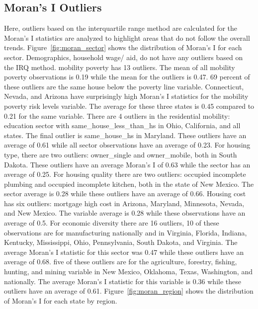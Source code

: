 \subsection{Moran's I Outliers}
Here, outliers based on the interquartile range method are calculated for the Moran's I statistics are analyzed to highlight areas that do not follow the overall trends. Figure~\ref{fig:moran_sector} shows the distribution of Moran's I for each sector. Demographics, household wage/ aid, do not have any outliers based on the IRQ method. mobility poverty has 13 outliers. The mean of all mobility poverty observations is 0.19 while the mean for the outliers is 0.47. 69 percent of these outliers are the same house below the poverty line variable. Connecticut, Nevada, and Arizona have surprisingly high Moran’s I statistics for the mobility poverty risk levels variable. The average for these three states is 0.45 compared to 0.21 for the same variable. There are 4 outliers in the residential mobility: education sector with same\_house\_less\_than\_hs in Ohio, California, and all states. The final outlier is same\_house\_hs in Maryland. These outliers have an average of 0.61 while all sector observations have an average of 0.23. For housing type, there are two outliers: owner\_single and owner\_mobile, both in South Dakota. These outliers have an average Moran’s I of 0.63 while the sector has an average of 0.25. For housing quality there are two outliers: occupied incomplete plumbing and occupied incomplete kitchen, both in the state of New Mexico. The sector average is 0.28 while these outliers have an average of 0.66. Housing cost has six outliers: mortgage high cost in Arizona, Maryland, Minnesota, Nevada, and New Mexico. The variable average is 0.28 while these observations have an average of 0.5. For economic diversity there are 16 outliers, 10 of these observations are for manufacturing nationally and in Virginia, Florida, Indiana, Kentucky, Mississippi, Ohio, Pennsylvania, South Dakota, and Virginia. The average Moran’s I statistic for this sector was 0.47 while these outliers have an average of 0.68. five of these outliers are for the agriculture, forestry, fishing, hunting, and mining variable in New Mexico, Oklahoma, Texas, Washington, and nationally. The average Moran’s I statistic for this variable is 0.36 while these outliers have an average of 0.61. Figure~\ref{fig:moran_region} shows the distribution of Moran's I for each state by region.

